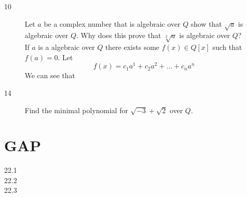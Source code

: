 \documentclass[11pt]{article}
\begin{document}
\begin{description}
	\item[10] Let $a$ be a complex number that is algebraic over $Q$ show
		that $\sqrt a$ is algebraic over $Q$. Why does this prove that
		$\sqrt[2]{a}$ is algebraic over $Q$?\\
		If $a$ is a algebraic over $Q$ there exists some $f(x) \in Q[x]$
		such that $f(a) = 0$. Let 
		$$f(x) = c_1a^1 +c_2a^2 +... +c_na^n $$
		We can see that
	\item[14] Find the minimal polynomial for $ \sqrt{-3} + \sqrt 2 $ over
		$Q$.\\
	\end{description}
\section{GAP}
	\begin{description}
	\item[22.1]
	\item[22.2]
	\item[22.3]
	\end{description}
\end{document}
